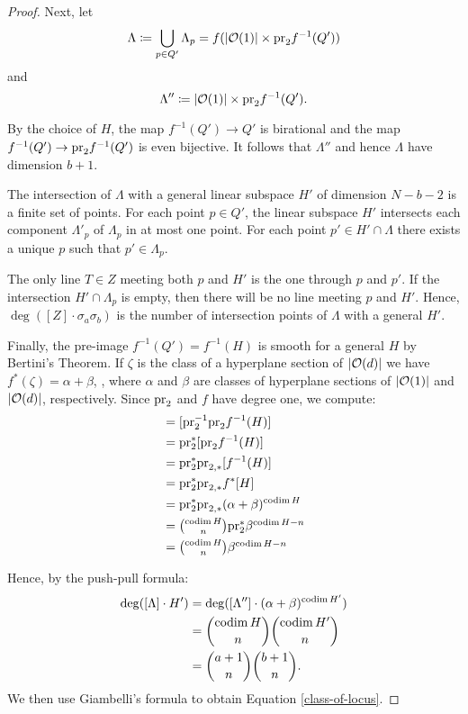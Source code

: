 \begin{proof}
	Next, let $$\Lambda \coloneqq \bigcup_{p\in Q'} \Lambda_p = f(\lvert\mathcal{O}(1)\rvert\times \mathrm{pr}_2 f^{-1}(Q'))$$ and $$\Lambda''\coloneqq \lvert\mathcal{O}(1)\rvert\times \mathrm{pr}_2 f^{-1}(Q').$$

	By the choice of $H$, the map $f^{-1}(Q')\to Q'$ is birational and the map $f^{-1}(Q')\to \mathrm{pr}_2f^{-1}(Q')$ is even bijective. It follows that $\Lambda''$ and hence $\Lambda$ have dimension $b+1$.

	The intersection of $\Lambda$ with a general linear subspace $H'$ of dimension $N-b-2$ is a finite set of points. For each point $p\in Q'$, the linear subspace $H'$ intersects each component $\Lambda'_p$ of $\Lambda_p$ in at most one point. For each point $p'\in H'\cap\Lambda$ there exists a unique $p$ such that $p'\in\Lambda_p$.

	The only line $T\in Z$ meeting both $p$ and $H'$ is the one through $p$ and $p'$. If the intersection $H'\cap \Lambda_p$ is empty, then there will be no line meeting $p$ and $H'$. Hence, $\deg([Z]\cdot \sigma_{a}\sigma_{b})$ is the number of intersection points of $\Lambda$ with a general $H'$.

	Finally, the pre-image $f^{-1}(Q') = f^{-1}(H)$ is smooth for a general $H$ by Bertini's Theorem. If $\zeta$ is the class of a hyperplane section of $\lvert\mathcal{O}(d)\rvert$ we have $f^*(\zeta) = \alpha + \beta$, , where $\alpha$ and $\beta$ are classes of hyperplane sections of $\lvert\mathcal{O}(1)\rvert$ and $\lvert\mathcal{O}(d)\rvert$, respectively. Since $\mathrm{pr}_2$ and $f$ have degree one, we compute:
	\begin{align*}
	[\Lambda''] & = [\pr_2^{-1}\pr_2 f^{-1}(H)] \\
	& = \pr_2^*[\pr_2 f^{-1}(H)] \\
	& = \pr_2^* \pr_{2,*}[f^{-1}(H)] \\
	& = \pr_2^*\pr_{2,*}f^*[H] \\
	& = \pr_2^* \pr_{2,*}(\alpha + \beta)^{\codim H} \\
	& = \textstyle{\binom{\codim H}{n}}\pr_2^* \beta^{\codim H -n} \\
	& = \textstyle{\binom{\codim H}{n}}\beta^{\codim H -n}
	\end{align*}

	Hence, by the push-pull formula:
	\begin{align*}
		\deg([\Lambda]\cdot H') &= \deg([\Lambda'']\cdot(\alpha+\beta)^{\operatorname{codim} H'}) \\ &= \binom{\operatorname{codim} H}{n}\binom{\operatorname{codim} H'}{n}
		\\ &=\binom{a+1}{n}\binom{b+1}{n}.
	\end{align*}
	We then use Giambelli's formula to obtain Equation \cref{class-of-locus}.


\end{proof}
